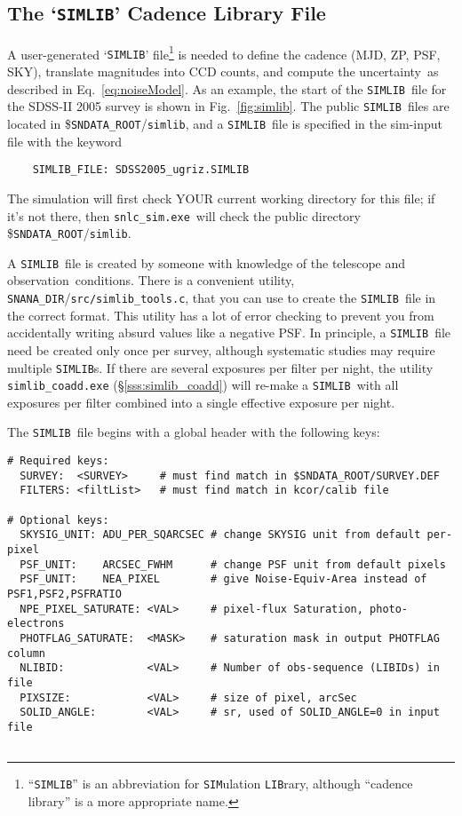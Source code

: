 \documentclass[12pt]{article}
\newcommand{\unc}{uncertainty}
\newcommand{\simexe}{{\tt snlc\_sim.exe}}
\newcommand{\snanadir}{{\tt SNANA\_DIR}}
\newcommand{\sndataroot}{{\tt SNDATA\_ROOT}}
\newcommand{\simlib}{{\tt SIMLIB}}
\newcommand{\obs}{observation}
\begin{document}
{%
  \clearpage
  \subsection{The `{\simlib}' Cadence Library File }
  \label{subsec:simlib}

A user-generated `{\simlib}' 
file\footnote{``{\simlib}'' is an abbreviation for 
   {\tt SIM}ulation {\tt LIB}rary, although ``cadence library'' 
   is a more appropriate name.}
is needed to define the cadence (MJD, ZP, PSF, SKY), 
translate magnitudes into CCD counts, 
and compute the \unc\ as described in Eq.~\ref{eq:noiseModel}.
%
As an example, the start of the \simlib\ file for the 
SDSS-II 2005 survey is shown in  Fig.~\ref{fig:simlib}.
The public \simlib\ files are located in \$\sndataroot/{\tt simlib},
and a \simlib\ file is specified in the sim-input file with 
the keyword
%
\begin{verbatim}
    SIMLIB_FILE: SDSS2005_ugriz.SIMLIB
\end{verbatim}
%
The simulation will first
check YOUR current working directory for this file; 
if it's not there, then \simexe\ will check the public directory
\$\sndataroot/{\tt simlib}.

A \simlib\ file is created by someone with knowledge of the
telescope and \obs\ conditions. There is a convenient utility, 
\snanadir/{\tt src/simlib\_tools.c}, 
that you can use to create the \simlib\ file in the correct format.
This utility has a lot of error checking to prevent you from
accidentally writing absurd values like a negative PSF.
In principle, a \simlib\ file need be created only once per survey,
although systematic studies may require multiple \simlib s.
If there are several exposures per filter per night,
the utility {\tt simlib\_coadd.exe} (\S\ref{sss:simlib_coadd})
will re-make a \simlib\ with all exposures per filter combined
into a single effective exposure per night.

The \simlib\ file begins with a global header with the following
keys:
\begin{verbatim}
# Required keys:
  SURVEY:  <SURVEY>     # must find match in $SNDATA_ROOT/SURVEY.DEF
  FILTERS: <filtList>   # must find match in kcor/calib file 

# Optional keys:
  SKYSIG_UNIT: ADU_PER_SQARCSEC # change SKYSIG unit from default per-pixel
  PSF_UNIT:    ARCSEC_FWHM      # change PSF unit from default pixels
  PSF_UNIT:    NEA_PIXEL        # give Noise-Equiv-Area instead of PSF1,PSF2,PSFRATIO
  NPE_PIXEL_SATURATE: <VAL>     # pixel-flux Saturation, photo-electrons
  PHOTFLAG_SATURATE:  <MASK>    # saturation mask in output PHOTFLAG column
  NLIBID:             <VAL>     # Number of obs-sequence (LIBIDs) in file
  PIXSIZE:            <VAL>     # size of pixel, arcSec
  SOLID_ANGLE:        <VAL>     # sr, used of SOLID_ANGLE=0 in input file


\end{verbatim}}
\end{document}
